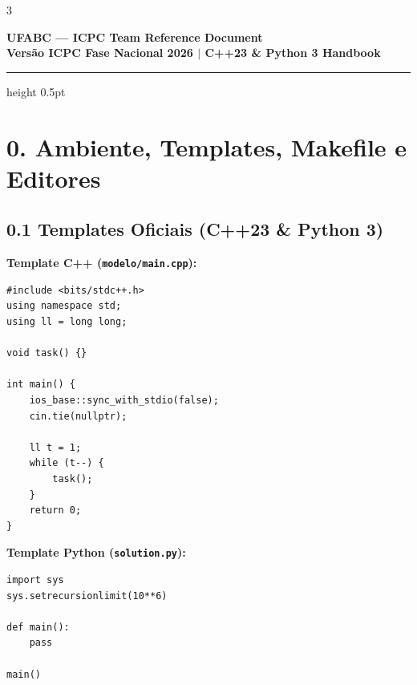 \documentclass[8pt,a4paper,landscape]{extarticle}
\makeatletter
\let\origsection\section
\renewcommand{\section}{\if@nobreak\else\needspace{6\baselineskip}\fi\origsection}
\let\origsubsection\subsection
\renewcommand{\subsection}{\if@nobreak\else\needspace{5\baselineskip}\fi\origsubsection}
\makeatother
\begin{document}
\begin{multicols*}{3}

\begin{center}
  {\normalsize\bfseries\color{secblue} UFABC — ICPC Team Reference Document}\\[1.2pt]
  {\fontsize{6.2pt}{7.2pt}\selectfont\textbf{Versão ICPC Fase Nacional 2026 $\mid$ C++23 \& Python 3 Handbook}}
\end{center}
\vspace{-2pt}
{\setlength{\parskip}{0.2pt}\setcounter{tocdepth}{2}\fontsize{5.8pt}{6.7pt}\selectfont\tableofcontents}
\vspace{2.0pt}
{\color{secblue!75}\hrule height 0.5pt}
\vspace{2.5pt}

\section*{0. Ambiente, Templates, Makefile e Editores}

\subsection*{0.1 Templates Oficiais (C++23 \& Python 3)}

\textbf{Template C++ (\texttt{modelo/main.cpp}):}
\begin{lstlisting}
#include <bits/stdc++.h>
using namespace std;
using ll = long long;

void task() {}

int main() {
    ios_base::sync_with_stdio(false);
    cin.tie(nullptr);

    ll t = 1;
    while (t--) {
        task();
    }
    return 0;
}
\end{lstlisting}

\textbf{Template Python (\texttt{solution.py}):}
\begin{lstlisting}[style=icpcplain]
import sys
sys.setrecursionlimit(10**6)

def main():
    pass

main()
\end{lstlisting}


\end{multicols*}
\end{document}
